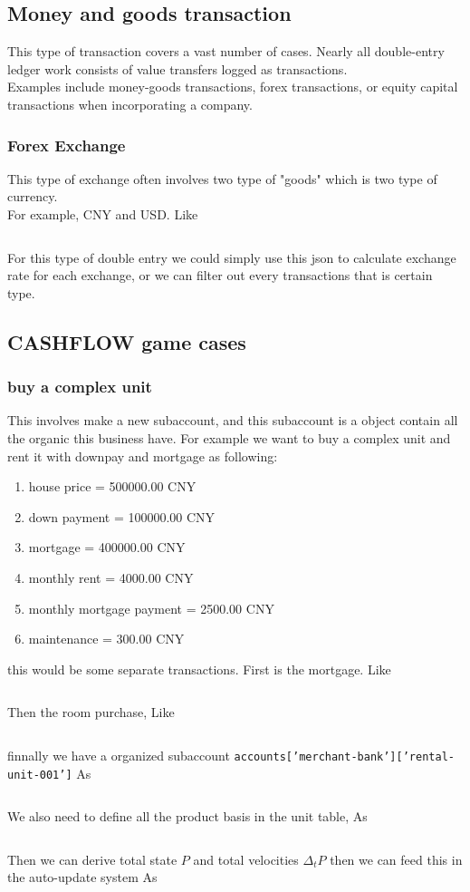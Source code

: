 \subsection{Money and goods transaction}
This type of transaction covers a vast number of cases.
Nearly all double-entry ledger work consists of
value transfers logged as transactions.\\
Examples include money-goods transactions, forex transactions,
or equity capital transactions when incorporating a company.\\

\subsubsection{Forex Exchange}
This type of exchange often involves
two type of "goods" which is two type of currency.\\
For example, CNY and USD.
Like \inputminted{json}{jsonobs/forex-exchange-1.json}
For this type of double entry we could simply use this
json to calculate exchange rate for each exchange,
or we can filter out every transactions that is certain type.


\subsection{CASHFLOW game cases}

\subsubsection{buy a complex unit}
This involves make a new subaccount,
and this subaccount is a object contain
all the organic this business have.
For example we want to buy a complex unit and rent it
with downpay and mortgage as following:
\begin{enumerate}
    \item house price = 500000.00 CNY
    \item down payment = 100000.00 CNY
    \item mortgage = 400000.00 CNY
    \item monthly rent = 4000.00 CNY
    \item monthly mortgage payment = 2500.00 CNY
    \item maintenance = 300.00 CNY
\end{enumerate}
this would be some separate transactions.
First is the mortgage.
Like \inputminted{json}{jsonobs/buy-a-complex-unit-5.json}
Then the room purchase,
Like \inputminted{json}{jsonobs/buy-a-complex-unit-6.json}
finnally we have a organized subaccount
\texttt{accounts['merchant-bank']['rental-unit-001']}
As \inputminted{json}{jsonobs/buy-a-complex-unit-3-P.json}
We also need to define all the product basis in the unit
table,
As \inputminted{json}{jsonobs/buy-a-complex-unit-4.json}
Then we can derive total state $P$ and total velocities
$\Delta_t P$ then we can feed this in the auto-update system
As \inputminted{json}{jsonobs/buy-a-complex-unit-3-dP.json}


